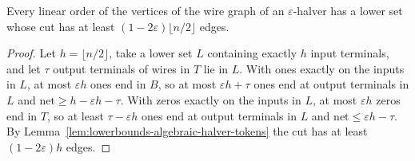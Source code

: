 \begin{lemma}
  \label{lem:lowerbounds-algebraic-halver-cut}
  \leanok
  Every linear order of the vertices of the wire graph of an $\varepsilon$-halver has a lower set
  whose cut has at least $(1-2\varepsilon)\lfloor n/2\rfloor$ edges.
\end{lemma}
\begin{proof}
  \leanok
  Let $h=\lfloor n/2\rfloor$, take a lower set $L$ containing exactly $h$ input terminals, and
  let $\tau$ output terminals of wires in $T$ lie in $L$. With ones exactly on the inputs in
  $L$, at most $\varepsilon h$ ones end in $B$, so at most $\varepsilon h+\tau$ ones end at
  output terminals in $L$ and $\mathrm{net}\ge h-\varepsilon h-\tau$. With zeros exactly on the
  inputs in $L$, at most $\varepsilon h$ zeros end in $T$, so at least $\tau-\varepsilon h$ ones
  end at output terminals in $L$ and $\mathrm{net}\le\varepsilon h-\tau$. By
  Lemma~\ref{lem:lowerbounds-algebraic-halver-tokens} the cut has at least
  $(1-2\varepsilon)h$ edges.
\end{proof}

